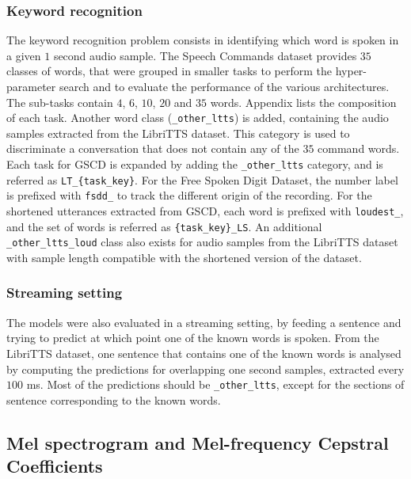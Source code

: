 \subsubsection{Keyword recognition}

The keyword recognition problem consists in identifying which word is spoken in
a given $1$ second audio sample.
The Speech Commands dataset provides $35$ classes of words, that were grouped
in smaller tasks to perform the hyper-parameter search and to evaluate the
performance of the various architectures.
The sub-tasks contain $4$, $6$, $10$, $20$ and $35$ words.
Appendix  lists the composition of each
task.
Another word class (\texttt{\_other\_ltts}) is added, containing the audio
samples extracted from the LibriTTS dataset.
This category is used to discriminate a conversation that does not contain any
of the $35$ command words.
Each task for GSCD is expanded by adding the \texttt{\_other\_ltts} category,
and is referred as \texttt{LT\_\{task\_key\}}.
For the Free Spoken Digit Dataset, the number label is prefixed with
\texttt{fsdd\_} to track the different origin of the recording.
For the shortened utterances extracted from GSCD, each word is prefixed with
\texttt{loudest\_}, and
the set of words is referred as
\texttt{\{task\_key\}\_LS}.
An additional \texttt{\_other\_ltts\_loud} class also exists for audio samples
from the LibriTTS dataset with sample length compatible with the shortened
version of the dataset.

\subsubsection{Streaming setting}

The models were also evaluated in a streaming setting, by feeding
a sentence and trying to predict at which point one of the known words is spoken.
From the LibriTTS dataset, one sentence that contains one of the known words is
analysed by computing the predictions for overlapping one second samples,
extracted every $100$ ms.
Most of the predictions should be \texttt{\_other\_ltts}, except for
the sections of sentence corresponding to the known words.

\subsection{Mel spectrogram and Mel-frequency Cepstral Coefficients}

